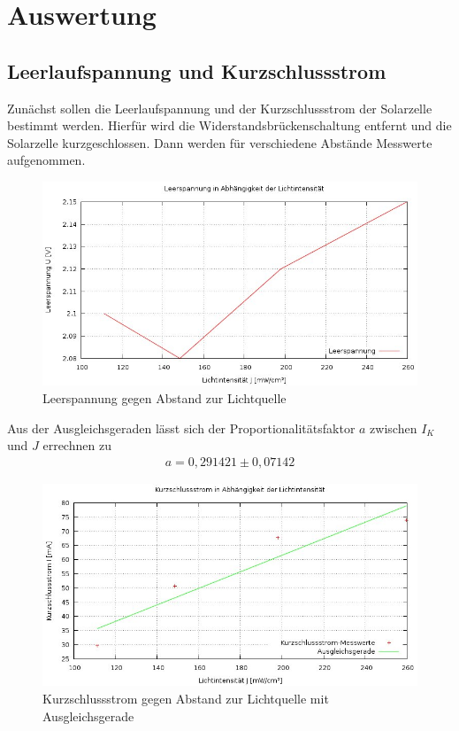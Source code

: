 \section{Auswertung}
\subsection{Leerlaufspannung und Kurzschlussstrom}
Zunächst sollen die Leerlaufspannung und der Kurzschlussstrom der Solarzelle bestimmt werden. Hierfür wird die Widerstandsbrückenschaltung entfernt und die Solarzelle kurzgeschlossen.
Dann werden für verschiedene Abstände Messwerte aufgenommen.

\begin{figure}[H]
	\includegraphics[width=\textwidth]{pics/Leerspannung_U.jpg}
	\caption{Leerspannung gegen Abstand zur Lichtquelle}
\end{figure}

Aus der Ausgleichsgeraden lässt sich der Proportionalitätsfaktor $a$ zwischen $I_K$ und $J$  errechnen zu
\begin{align*}
	a=0,291421 \pm 0,07142
\end{align*}

\begin{figure}[H]
	\includegraphics[width=1\textwidth]{pics/Kurzschluss_I_mit_gerade.jpg}
	\caption{Kurzschlussstrom gegen Abstand zur Lichtquelle mit Ausgleichsgerade}
\end{figure}

